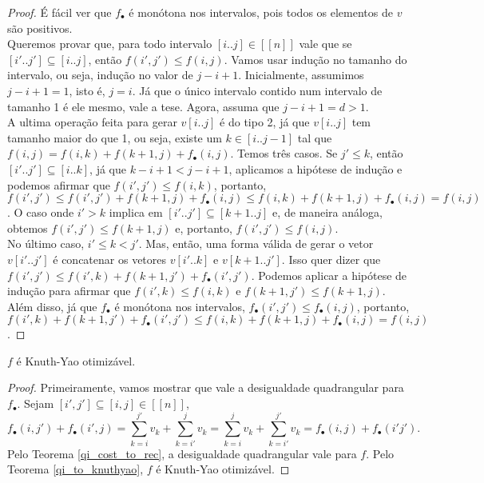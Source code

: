 \begin{proof}
É fácil ver que $f_\bullet$ é monótona nos intervalos, pois todos os elementos de $v$ são positivos. \\
Queremos provar que, para todo intervalo $[i..j] \in [[n]]$ vale que se $[i'..j'] \subseteq [i..j]$, então $f(i',j') \leq f(i,j)$. Vamos usar indução no tamanho do intervalo, ou seja, indução no valor de $j - i + 1$. Inicialmente, assumimos $j - i + 1 = 1$, isto é, $j = i$. Já que o único intervalo contido num intervalo de tamanho 1 é ele mesmo, vale a tese. Agora, assuma que $j - i + 1 = d > 1$. \\
A ultima operação feita para gerar $v[i..j]$ é do tipo 2, já que $v[i..j]$ tem tamanho maior do que 1, ou seja, existe um $k \in [i..j-1]$ tal que $f(i,j) = f(i,k) + f(k+1,j) + f_\bullet(i,j)$. Temos três casos. Se $j' \leq k$, então $[i'..j'] \subseteq [i..k]$, já que $k - i + 1 < j - i + 1$, aplicamos a hipótese de indução e podemos afirmar que $f(i',j') \leq f(i,k)$, portanto, $f(i',j') \leq f(i',j') + f(k+1,j) + f_\bullet(i,j) \leq f(i,k) + f(k+1,j) + f_\bullet(i,j) = f(i,j)$. O caso onde $i' > k$ implica em $[i'..j'] \subseteq [k+1..j]$ e, de maneira análoga, obtemos $f(i',j') \leq f(k+1,j)$ e, portanto, $f(i',j') \leq f(i,j)$. \\
No último caso, $i' \leq k < j'$. Mas, então, uma forma válida de gerar o vetor $v[i'..j']$ é concatenar os vetores $v[i'..k]$ e $v[k+1..j']$. Isso quer dizer que $f(i',j') \leq f(i',k) + f(k+1,j') + f_\bullet(i',j')$. Podemos aplicar a hipótese de indução para afirmar que $f(i',k) \leq f(i,k)$ e $f(k+1,j') \leq f(k+1,j)$. Além disso, já que $f_\bullet$ é monótona nos intervalos, $f_\bullet(i',j') \leq f_\bullet(i,j)$, portanto, $f(i',k) + f(k+1,j') + f_\bullet(i',j') \leq f(i,k) + f(k+1,j) + f_\bullet(i,j) = f(i,j)$.
\end{proof}

\begin{prop}
$f$ é Knuth-Yao otimizável.
\end{prop}

\begin{proof}
Primeiramente, vamos mostrar que vale a desigualdade quadrangular para $f_\bullet$. Sejam $[i',j'] \subseteq [i,j] \in [[n]]$,
$$
f_\bullet(i,j') + f_\bullet(i',j) = 
\sum\limits_{k=i}^{j'} v_k + \sum\limits_{k=i'}^j v_k =
\sum\limits_{k=i}^j v_k + \sum\limits_{k=i'}^{j'} v_k =
f_\bullet(i,j) + f_\bullet(i'j') \text{.} 
$$
Pelo Teorema \ref{qi_cost_to_rec}, a desigualdade quadrangular vale para $f$. Pelo Teorema \ref{qi_to_knuthyao}, $f$ é Knuth-Yao otimizável.
\end{proof}

